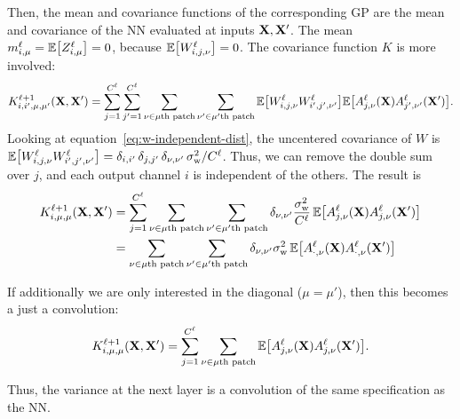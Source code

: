 \documentclass{article}
\newcommand{\patchfun}[1]{{#1}\text{th patch}}
\begin{document}
Then, the mean and covariance functions of the corresponding GP are the mean and covariance of the NN evaluated at inputs $\mathbf{X}, \mathbf{X}'$. The mean $m\ssup{\ell}_{i,\mu} = \ExpSymb\sqb{Z\ssup{\ell}_{i,\mu}} = 0$, because $\ExpSymb\sqb{W\ssup{\ell}_{i,j,\nu}}=0$. The covariance function $K$ is more involved:
\begin{equation}
    K\ssup{\ell+1}_{i,i',\mu,\mu'}(\vX, \vX') %
    = \sum_{j=1}^{C\ssup{\ell}} \sum_{j'=1}^{C\ssup{\ell}} \sum_{\nu \in \patchfun{\mu}} \sum_{\nu' \in \patchfun{\mu'}} \ExpSymb\sqb{
    W\ssup{\ell}_{i,j,\nu} W\ssup{\ell}_{i',j',\nu'}} \ExpSymb\sqb{A\ssup{\ell}_{j,\nu}(\vX) A\ssup{\ell}_{j',\nu'}(\vX')}.
  \label{eq:cov-independent}
\end{equation}
Looking at equation~\cref{eq:w-independent-dist}, the uncentered covariance of $W$ is $\ExpSymb\sqb{W\ssup{\ell}_{i,j,\nu}W\ssup{\ell}_{i',j',\nu'}} = \delta_{i,i'} \, \delta_{j, j'} \, \delta_{\nu, \nu'}\, \sigma_\text{w}^2/C\ssup{\ell}$. Thus, we can remove the double sum over $j$, and each output channel $i$ is independent of the others. The result is 
\begin{align}
    K\ssup{\ell+1}_{i,\mu,\mu}(\vX, \vX') %
    &= \sum_{j=1}^{C\ssup{\ell}} \sum_{\nu \in \patchfun{\mu}} \sum_{\nu' \in \patchfun{\mu'}} \delta_{\nu,\nu'} \frac{\sigma^2_\text{w}}{C\ssup{\ell}}\,
    \ExpSymb\sqb{A\ssup{\ell}_{j,\nu}(\vX) A\ssup{\ell}_{j,\nu}(\vX')} \\
    &= \sum_{\nu \in \patchfun{\mu}} \sum_{\nu' \in \patchfun{\mu'}} \delta_{\nu,\nu'} \sigma^2_\text{w}\,
      \ExpSymb\sqb{A\ssup{\ell}_{\cdot,\nu}(\vX) A\ssup{\ell}_{\cdot,\nu}(\vX')} 
\end{align}

If additionally we are only interested in the diagonal ($\mu=\mu'$), then this
becomes a just a convolution:
\begin{equation*}
    K\ssup{\ell+1}_{i,\mu,\mu}(\vX, \vX') %
    = \sum_{j=1}^{C\ssup{\ell}} \sum_{\nu \in \patchfun{\mu}}  \ExpSymb\sqb{A\ssup{\ell}_{j,\nu}(\vX) A\ssup{\ell}_{j,\nu}(\vX')}.
\end{equation*}

Thus, the variance at the next layer is a convolution of the same specification as the NN.
\end{document}
